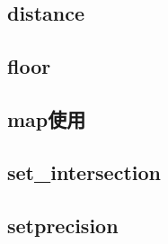     \subsection{distance}
            
    \subsection{floor}
            
    \subsection{map使用}
            
    \subsection{set_intersection}
            
    \subsection{setprecision}
            